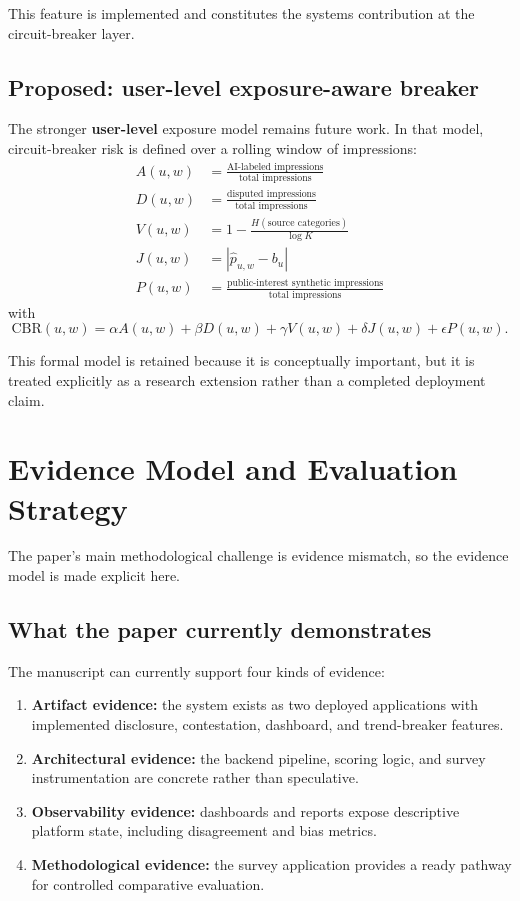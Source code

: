 \documentclass[acmlarge,screen,nonacm]{acmart}
\begin{document}
This feature is implemented and constitutes the systems contribution at the circuit-breaker layer.

\subsection{Proposed: user-level exposure-aware breaker}

The stronger \textbf{user-level} exposure model remains future work. In that model, circuit-breaker risk is defined over a rolling window of impressions:
\begin{align}
A(u,w) &= \frac{\text{AI-labeled impressions}}{\text{total impressions}} \\
D(u,w) &= \frac{\text{disputed impressions}}{\text{total impressions}} \\
V(u,w) &= 1 - \frac{H(\text{source categories})}{\log K} \\
J(u,w) &= |\hat{p}_{u,w} - b_u| \\
P(u,w) &= \frac{\text{public-interest synthetic impressions}}{\text{total impressions}}
\end{align}
with
\begin{equation}
\mathrm{CBR}(u,w) = \alpha A(u,w) + \beta D(u,w) + \gamma V(u,w) + \delta J(u,w) + \epsilon P(u,w).
\end{equation}

This formal model is retained because it is conceptually important, but it is treated explicitly as a research extension rather than a completed deployment claim.

\section{Evidence Model and Evaluation Strategy}

The paper's main methodological challenge is evidence mismatch, so the evidence model is made explicit here.

\subsection{What the paper currently demonstrates}

The manuscript can currently support four kinds of evidence:
\begin{enumerate}[leftmargin=1.5em]
    \item \textbf{Artifact evidence:} the system exists as two deployed applications with implemented disclosure, contestation, dashboard, and trend-breaker features.
    \item \textbf{Architectural evidence:} the backend pipeline, scoring logic, and survey instrumentation are concrete rather than speculative.
    \item \textbf{Observability evidence:} dashboards and reports expose descriptive platform state, including disagreement and bias metrics.
    \item \textbf{Methodological evidence:} the survey application provides a ready pathway for controlled comparative evaluation.
\end{enumerate}
\end{document}
